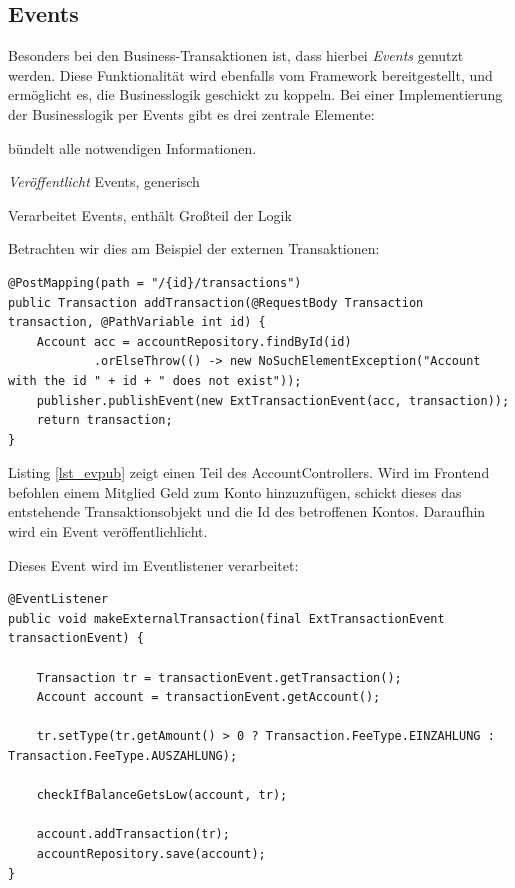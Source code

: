 \documentclass[a4paper, 11pt]{article}
\providecommand{\tightlist}{%
  \setlength{\itemsep}{0pt}\setlength{\parskip}{0pt}}
\begin{document}
\subsection{Events}

Besonders bei den Business-Transaktionen ist, dass hierbei \emph{Events}
genutzt werden. Diese Funktionalität wird ebenfalls vom Framework
bereitgestellt, und ermöglicht es, die Businesslogik geschickt zu koppeln. Bei
einer Implementierung der Businesslogik per Events gibt es drei zentrale
Elemente:

\begin{description}
\tightlist
\item[Event] bündelt alle notwendigen Informationen.
\item[Eventpublisher] \emph{Veröffentlicht} Events, generisch
\item[Eventlistener] Verarbeitet Events, enthält Großteil der Logik
\end{description}

Betrachten wir dies am Beispiel der externen Transaktionen:

\begin{lstlisting}[caption={Ausschnitt aus AccountController, in dem Event veröffentlicht wird},label=lst_evpub]
@PostMapping(path = "/{id}/transactions")
public Transaction addTransaction(@RequestBody Transaction transaction, @PathVariable int id) {
    Account acc = accountRepository.findById(id)
            .orElseThrow(() -> new NoSuchElementException("Account with the id " + id + " does not exist"));
    publisher.publishEvent(new ExtTransactionEvent(acc, transaction));
    return transaction;
}
\end{lstlisting}

Listing \ref{lst_evpub} zeigt einen Teil des AccountControllers. Wird im
Frontend befohlen einem Mitglied Geld zum Konto hinzuzufügen, schickt dieses
das entstehende Transaktionsobjekt und die Id des betroffenen Kontos. Daraufhin
wird ein Event veröffentlichlicht.

Dieses Event wird im Eventlistener verarbeitet:

\begin{lstlisting}[caption=Eventlistener für externe Transaktionen,label=lst_TEL]
@EventListener
public void makeExternalTransaction(final ExtTransactionEvent transactionEvent) {

    Transaction tr = transactionEvent.getTransaction();
    Account account = transactionEvent.getAccount();

    tr.setType(tr.getAmount() > 0 ? Transaction.FeeType.EINZAHLUNG : Transaction.FeeType.AUSZAHLUNG);

    checkIfBalanceGetsLow(account, tr);

    account.addTransaction(tr);
    accountRepository.save(account);
}
\end{lstlisting}
\end{document}
